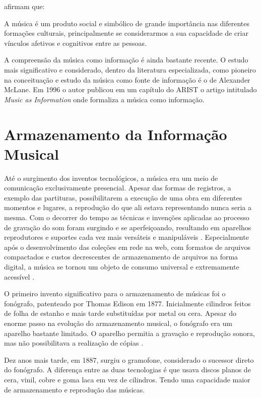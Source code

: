  afirmam que:

\begin{citacao}
A música é um produto social e simbólico de grande importância nas diferentes formações culturais, principalmente se considerarmos a sua capacidade de criar vínculos afetivos e cognitivos entre as pessoas.
\end{citacao}

A compreensão da música como informação é ainda bastante recente. O estudo mais significativo e considerado, dentro da literatura especializada, como pioneiro na conceituação e estudo da música como fonte de informação é o de Alexander McLane. Em 1996 o autor publicou em um capítulo do ARIST  o artigo intitulado \textit{Music as Information} onde formaliza a música como informação.

\section{Armazenamento da Informação Musical}

Até o surgimento dos inventos tecnológicos, a música era um meio de comunicação exclusivamente presencial. Apesar das formas de registros, a exemplo das partituras, possibilitarem a execução de uma obra em diferentes momentos e lugares, a reprodução do que ali estava representando nunca seria a mesma. Com o decorrer do tempo as técnicas e invenções aplicadas ao processo de gravação do som foram surgindo e se aperfeiçoando, resultando em aparelhos reprodutores e suportes cada vez mais versáteis e manipuláveis \cite{daquino2012}. Especialmente após o desenvolvimento das coleções em rede na web, com formatos de arquivos compactados e custos decrescentes de armazenamento de arquivos na forma digital, a música se tornou um objeto de consumo universal e extremamente acessível \cite{gomes2015}.

O primeiro invento significativo para o armazenamento de músicas foi o fonógrafo, patenteado por Thomas Edison em 1877. Inicialmente cilindros feitos de folha de estanho e mais tarde substituídas por metal ou cera. Apesar do enorme passo na evolução do armazenamento musical, o fonógrafo era um aparelho bastante limitado. O aparelho permitia a gravação e reprodução sonora, mas não possibilitava a realização de cópias \cite{marchi2005}.

Dez anos mais tarde, em 1887, surgiu o gramofone, considerado o sucessor direto do fonógrafo. A diferença entre as duas tecnologias é que usava discos planos de cera, vinil, cobre e goma laca em vez de cilindros. Tendo uma capacidade maior de armazenamento e reprodução das músicas.


